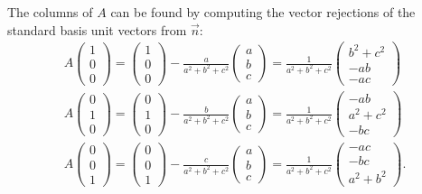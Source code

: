 \documentclass[12pt]{article}
\begin{document}
The columns of $A$ can be found by computing the vector rejections of the
standard basis unit vectors from $\vec{n}$:
\begin{gather*}
	A \begin{pmatrix} 1 \\ 0 \\ 0 \end{pmatrix}
	=
	\begin{pmatrix} 1 \\ 0 \\ 0 \end{pmatrix}
	-
	\frac{a}{a^2 + b^2 + c^2}
	\begin{pmatrix} a \\ b \\ c \end{pmatrix}
	=
	\frac{1}{a^2 + b^2 + c^2}
	\begin{pmatrix}
		b^2 + c^2 \\
		-ab \\
		-ac
	\end{pmatrix}
	\\
	A \begin{pmatrix} 0 \\ 1 \\ 0 \end{pmatrix}
	=
	\begin{pmatrix} 0 \\ 1 \\ 0 \end{pmatrix}
	-
	\frac{b}{a^2 + b^2 + c^2}
	\begin{pmatrix} a \\ b \\ c \end{pmatrix}
	=
	\frac{1}{a^2 + b^2 + c^2}
	\begin{pmatrix}
		-ab \\
		a^2 + c^2 \\
		-bc
	\end{pmatrix}
	\\
	A \begin{pmatrix} 0 \\ 0 \\ 1 \end{pmatrix}
	=
	\begin{pmatrix} 0 \\ 0 \\ 1 \end{pmatrix}
	-
	\frac{c}{a^2 + b^2 + c^2}
	\begin{pmatrix} a \\ b \\ c \end{pmatrix}
	=
	\frac{1}{a^2 + b^2 + c^2}
	\begin{pmatrix}
		-ac \\
		-bc \\
		a^2 + b^2
	\end{pmatrix}
	.
\end{gather*}
\end{document}

